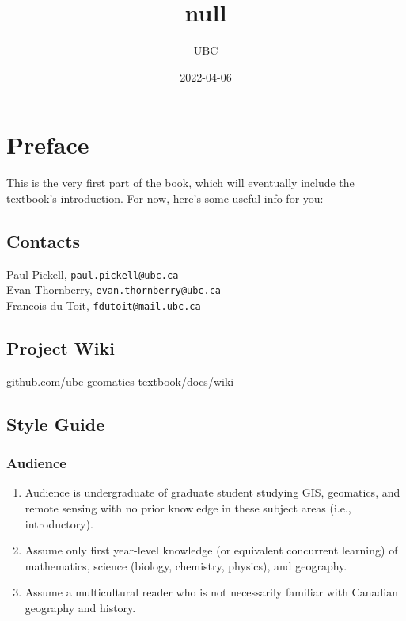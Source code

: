 \documentclass[
]{book}
\title{null}
\author{UBC}
\date{2022-04-06}
\providecommand{\tightlist}{%
  \setlength{\itemsep}{0pt}\setlength{\parskip}{0pt}}
\begin{document}
\maketitle

{
\setcounter{tocdepth}{1}
\tableofcontents
}
\hypertarget{preface}{%
\chapter*{Preface}\label{preface}}

This is the very first part of the book, which will eventually include the textbook's introduction. For now, here's some useful info for you:

\hypertarget{contacts}{%
\section{Contacts}\label{contacts}}

Paul Pickell, \href{mailto:paul.pickell@ubc.ca}{\nolinkurl{paul.pickell@ubc.ca}}\\
Evan Thornberry, \href{mailto:evan.thornberry@ubc.ca}{\nolinkurl{evan.thornberry@ubc.ca}}\\
Francois du Toit, \href{mailto:fdutoit@mail.ubc.ca}{\nolinkurl{fdutoit@mail.ubc.ca}}

\hypertarget{project-wiki}{%
\section{Project Wiki}\label{project-wiki}}

\href{https://github.com/ubc-geomatics-textbook/docs/wiki}{github.com/ubc-geomatics-textbook/docs/wiki}

\hypertarget{style-guide}{%
\section{Style Guide}\label{style-guide}}

\hypertarget{audience}{%
\subsection{Audience}\label{audience}}

\begin{enumerate}
\def\labelenumi{\arabic{enumi}.}
\tightlist
\item
  Audience is undergraduate of graduate student studying GIS, geomatics, and remote sensing with no prior knowledge in these subject areas (i.e., introductory).
\item
  Assume only first year-level knowledge (or equivalent concurrent learning) of mathematics, science (biology, chemistry, physics), and geography.
\item
  Assume a multicultural reader who is not necessarily familiar with Canadian geography and history.
\end{enumerate}
\end{document}
